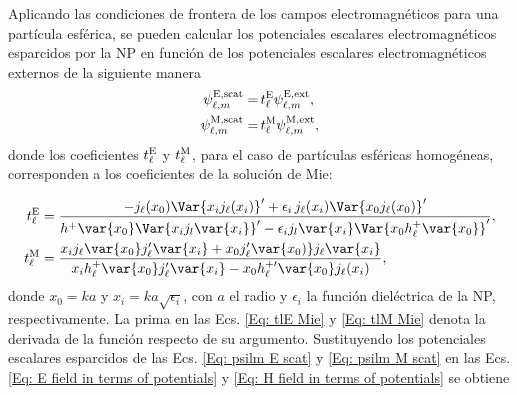 Aplicando las condiciones de frontera de los campos electromagnéticos para una partícula esférica, se pueden calcular los potenciales escalares electromagnéticos esparcidos por la NP en función de los potenciales escalares electromagnéticos externos de la siguiente manera \cite{de1999relativistic}
\begin{align}
\psi_{\ell, m}^{\rm E, scat} =& \,t_{\ell}^{\rm E} \psi_{\ell, m}^{\rm E, \text{ext}}, \label{Eq: psilm E scat}\\
\psi_{\ell, m}^{\rm M, scat} =& \,t_{\ell}^{\rm M} \psi_{\ell, m}^{\rm M, \text{ext}}, \label{Eq: psilm M scat}
\end{align} 
donde los coeficientes $t_{\ell}^{\rm E}$ y $t_{\ell}^{\rm M}$, para el caso de partículas esféricas homogéneas, corresponden a los coeficientes de la solución de Mie: \cite{Bohren}

\begin{align}
t_{\ell}^{\rm E} &=\frac{-j_{\ell}(x_0)\Var{x_i j_{\ell}(x_i)}^{\prime}+\epsilon_i\,j_{\ell}(x_i)\Var{x_0j_{\ell}(x_0)}^{\prime}}{h^{+}\var{x_0}\Var{x_i j_l\var{x_i}}^{\prime}-\epsilon_i j_l\var{x_i}\Var{x_0 h_{\ell}^{+}\var{x_0}}^{\prime}}, \label{Eq: tlE Mie}\\
t_{\ell}^{\rm M} &= \frac{x_i j_{\ell}\var{x_0}j_{\ell}^{\prime}\var{x_i}+ x_0 j_{\ell}^{\prime}\var{x_0)} j_{\ell}\var{x_i} }{x_i h_{\ell}^{+}\var{x_0} j_{\ell}^{\prime}\var{x_i} - x_0 h_{\ell}^{+ \prime}\var{x_0} j_{\ell}(x_i)}, \label{Eq: tlM Mie}
\end{align}
donde $x_0 = k a$ y $x_i = k a \sqrt{\epsilon_i}$, con $a$ el radio y $\epsilon_i$ la función dieléctrica de la NP, respectivamente. La prima en las Ecs. \eqref{Eq: tlE Mie} y \eqref{Eq: tlM Mie} denota la derivada de la función respecto de su argumento. Sustituyendo los potenciales escalares esparcidos de las Ecs. \eqref{Eq: psilm E scat} y \eqref{Eq: psilm M scat} en las Ecs. \eqref{Eq: E field in terms of potentials} y \eqref{Eq: H field in terms of potentials} se obtiene 

